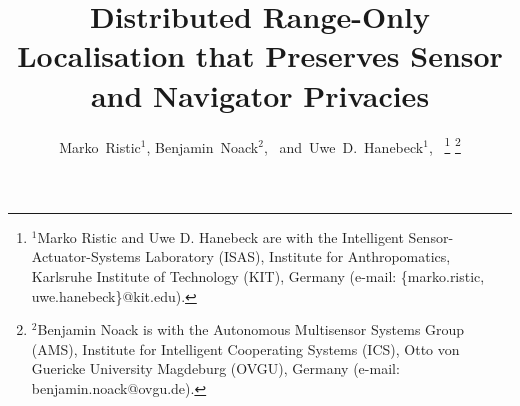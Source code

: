 \documentclass[10pt,letterpaper,oneside,twocolumn,journal]{IEEEtran}
\theoremstyle{definition}
\theoremstyle{definition}
\theoremstyle{remark}
\begin{document}
\title{Distributed Range-Only Localisation that Preserves Sensor and Navigator Privacies}

\author{Marko~Ristic$^{1}$,
        Benjamin~Noack$^{2}$,~
        and~Uwe~D.~Hanebeck$^{1}$,~%
\thanks{$^{1}$Marko Ristic and Uwe D. Hanebeck are with the Intelligent Sensor-Actuator-Systems Laboratory (ISAS), Institute for Anthropomatics, Karlsruhe Institute of Technology (KIT), Germany (e-mail: \{marko.ristic, uwe.hanebeck\}@kit.edu).}%
\thanks{$^{2}$Benjamin Noack is with the Autonomous Multisensor Systems Group (AMS), Institute for Intelligent Cooperating Systems (ICS), Otto von Guericke University Magdeburg (OVGU), Germany (e-mail: benjamin.noack@ovgu.de).}}%

\maketitle

% 
%                                                                                             
%                                                                                             
%                                                                                             
% 
\end{document}
